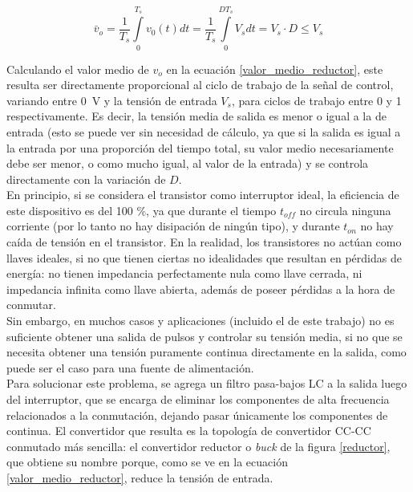 \begin{equation}\label{valor_medio_reductor}
    \bar{v}_o = \frac{1}{T_s}\int\limits^{T_s}_0 v_0(t) dt = \frac{1}{T_s}\int\limits^{DT_s}_0 V_s dt = V_s\cdot D \leq V_s
\end{equation}

Calculando el valor medio de $v_o$ en la ecuación \ref{valor_medio_reductor}, este resulta ser directamente proporcional al ciclo de trabajo de la señal de control, variando entre \SI[]{0}[]{\volt} y la tensión de entrada $V_s$, para ciclos de trabajo entre \num{0} y \num{1} respectivamente. Es decir, la {\Medium tensión media de salida es menor o igual a la de entrada} (esto se puede ver sin necesidad de cálculo, ya que si la salida es igual a la entrada por una proporción del tiempo total, su valor medio necesariamente debe ser menor, o como mucho igual, al valor de la entrada) y se controla directamente con la variación de $D$.\\

En principio, si se considera el transistor como interruptor ideal, la eficiencia de este dispositivo es del 100 \%, ya que durante el tiempo $t_{off}$ no circula ninguna corriente (por lo tanto no hay disipación de ningún tipo), y durante $t_{on}$ no hay caída de tensión en el transistor. En la realidad, los transistores no actúan como llaves ideales, si no que tienen ciertas no idealidades que resultan en pérdidas de energía: no tienen impedancia perfectamente nula como llave cerrada, ni impedancia infinita como llave abierta, además de poseer pérdidas a la hora de conmutar.\\

Sin embargo, en muchos casos y aplicaciones (incluido el de este trabajo) no es suficiente obtener una salida de pulsos y controlar su tensión media, si no que se necesita obtener una tensión puramente continua directamente en la salida, como puede ser el caso para una fuente de alimentación.\\

Para solucionar este problema, se agrega un filtro pasa-bajos LC a la salida luego del interruptor, que se encarga de eliminar los componentes de alta frecuencia relacionados a la conmutación, dejando pasar únicamente los componentes de continua. El convertidor que resulta es la topología de convertidor CC-CC conmutado más sencilla: el {\Medium convertidor reductor} o {\Medium \textit{buck}} de la figura \ref{reductor}, que obtiene su nombre porque, como se ve en la ecuación \ref{valor_medio_reductor}, reduce la tensión de entrada.\\

